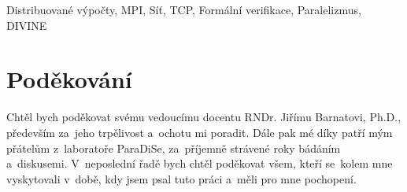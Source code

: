 \documentclass[11pt,twoside,a4paper]{book}
\begin{document}
Distribuované výpočty, MPI, Síť, TCP, Formální verifikace,
Paralelizmus, DIVINE

\cleardoublepage

\section*{Poděkování}

Chtěl bych poděkovat svému vedoucímu docentu RNDr. Jiřímu Barnatovi, Ph.D., především za~jeho trpělivost a~ochotu mi poradit.
Dále pak mé díky patří mým přátelům z~laboratoře ParaDiSe, za~příjemně strávené roky bádáním a~diskusemi.
V~neposlední řadě bych chtěl poděkovat všem, kteří se~kolem mne vyskytovali v~době, kdy jsem psal tuto práci a~měli pro mne pochopení.

\cleardoublepage

\thispagestyle{empty}

\pagestyle{headings}
\tableofcontents
\mainmatter



\appendix




\end{document}
